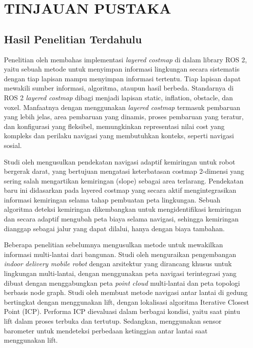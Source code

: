 \chapter{TINJAUAN PUSTAKA}
\label{chap:tinjauanpustaka}


\section{Hasil Penelitian Terdahulu}
\label{sec:hasil_terdahulu}

Penelitian oleh \parencite[]{macenski2023desks} membahas implementasi \emph{layered costmap} di dalam library ROS 2, yaitu sebuah metode untuk menyimpan informasi lingkungan secara sistematis dengan tiap lapisan mampu menyimpan informasi tertentu. Tiap lapisan dapat mewakili sumber informasi, algoritma, ataupun hasil berbeda. Standarnya di ROS 2 \emph{layered costmap} dibagi menjadi lapisan static, inflation, obstacle, dan voxel. Manfaatnya dengan menggunakan \emph{layered costmap} termasuk pembaruan yang lebih jelas, area pembaruan yang dinamis, proses pembaruan yang teratur, dan konfigurasi yang fleksibel, memungkinkan representasi nilai cost yang kompleks dan perilaku navigasi yang membutuhkan konteks, seperti navigasi sosial.

Studi oleh \parencite{hu2022slope} mengusulkan pendekatan navigasi adaptif kemiringan untuk robot bergerak darat, yang bertujuan mengatasi keterbatasan costmap 2-dimensi yang sering salah mengartikan kemiringan (slope) sebagai area terlarang. Pendekatan baru ini didasarkan pada layered costmap yang secara aktif mengintegrasikan informasi kemiringan selama tahap pembuatan peta lingkungan. Sebuah algoritma deteksi kemiringan dikembangkan untuk mengidentifikasi kemiringan dan secara adaptif mengubah peta biaya selama navigasi, sehingga kemiringan dianggap sebagai jalur yang dapat dilalui, hanya dengan biaya tambahan. 

Beberapa penelitian sebelumnya mengusulkan metode untuk mewakilkan informasi multi-lantai dari bangunan. Studi oleh \parencite[]{kim2024development} menguraikan pengembangan \emph{indoor delivery mobile robot} dengan arsitektur yang dirancang khusus untuk lingkungan multi-lantai, dengan menggunakan peta navigasi terintegrasi yang dibuat dengan menggabungkan peta \emph{point cloud} multi-lantai dan peta topologi berbasis node graph. Studi oleh \parencite[]{palacin2023procedure} membuat metode navigasi antar lantai di gedung bertingkat dengan menggunakan lift, dengan lokalisasi algoritma Iterative Closest Point (ICP). Performa ICP dievaluasi dalam berbagai kondisi, yaitu saat pintu lift dalam proses terbuka dan tertutup. Sedangkan, \parencite[]{jung2024munes} menggunakan sensor barometer untuk mendeteksi perbedaan ketinggian antar lantai saat menggunakan lift.

